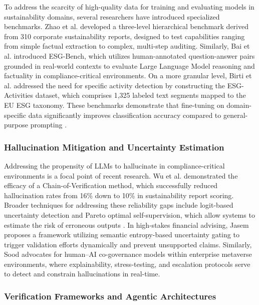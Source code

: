 \documentclass{article}
\begin{document}
To address the scarcity of high-quality data for training and evaluating models in sustainability domains, several researchers have introduced specialized benchmarks. Zhao et al.  \parencite{yilei_zhao_b7bbd9c8} developed a three-level hierarchical benchmark derived from 310 corporate sustainability reports, designed to test capabilities ranging from simple factual extraction to complex, multi-step auditing. Similarly, Bai et al.  \parencite{association_for_artificial_intelligence_2026_86e12eae} introduced ESG-Bench, which utilizes human-annotated question-answer pairs grounded in real-world contexts to evaluate Large Language Model reasoning and factuality in compliance-critical environments. On a more granular level, Birti et al.  \parencite{mattia_birti_c097e3e8} addressed the need for specific activity detection by constructing the ESG-Activities dataset, which comprises 1,325 labeled text segments mapped to the EU ESG taxonomy. These benchmarks demonstrate that fine-tuning on domain-specific data significantly improves classification accuracy compared to general-purpose prompting  \parencite{mattia_birti_c097e3e8}.
\subsubsection{Hallucination Mitigation and Uncertainty Estimation}

Addressing the propensity of LLMs to hallucinate in compliance-critical environments is a focal point of recent research. Wu et al.  \parencite{yue_wu_cae353aa} demonstrated the efficacy of a Chain-of-Verification method, which successfully reduced hallucination rates from 16\% down to 10\% in sustainability report scoring. Broader techniques for addressing these reliability gaps include logit-based uncertainty detection and Pareto optimal self-supervision, which allow systems to estimate the risk of erroneous outputs  \parencite{yue_zhang_9101e661}. In high-stakes financial advising, Jasem  \parencite{al_noor_ali_aziz_jasem_af362154} proposes a framework utilizing semantic entropy-based uncertainty gating to trigger validation efforts dynamically and prevent unsupported claims. Similarly, Sood  \parencite{rohit_sood_cb3a4ead} advocates for human–AI co-governance models within enterprise metaverse environments, where explainability, stress-testing, and escalation protocols serve to detect and constrain hallucinations in real-time.
\subsubsection{Verification Frameworks and Agentic Architectures}
\end{document}
